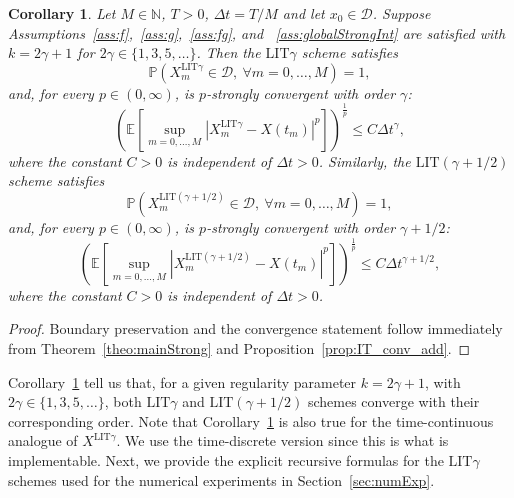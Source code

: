 \documentclass[11pt]{amsart}
\newtheorem{corollary}[theorem]{Corollary}
\newcommand{\N}{{\mathbb N}}
\newcommand{\E}{{\mathbb E}}
\newcommand{\PP}{{\mathbb P}}
\newcommand{\D}{\mathcal{D}}
\newcommand{\LIT}{\textrm{LIT}}
\begin{document}
{\begin{corollary}\label{cor:LIT_conv}
Let $M\in\N$, $T > 0$, $\Delta t = T/M$ and let $x_{0} \in \D$. Suppose Assumptions~\ref{ass:f},~\ref{ass:g},~\ref{ass:fg}, and ~\ref{ass:globalStrongInt} are satisfied with $k = 2 \gamma + 1$ for $2 \gamma \in \{1,3,5,\ldots \}$. Then the $\LIT \gamma$ scheme satisfies
\begin{equation*}
\PP (X^{\LIT \gamma}_{m} \in \D,\ \forall m = 0,\ldots,M) = 1,
\end{equation*}
and, for every $p \in (0,\infty)$, is $p$-strongly convergent with order $\gamma$:
\begin{equation*}
\left( \E \left[ \sup_{m=0, \ldots, M} | X_{m}^{\LIT \gamma} - X(t_{m}) |^{p} \right] \right)^{\frac{1}{p}} \leq C \Delta t^{\gamma},
\end{equation*}
where the constant $C>0$ is independent of $\Delta t >0$. Similarly, the $\LIT (\gamma+1/2)$ scheme satisfies
\begin{equation*}
\PP (X^{\LIT (\gamma+1/2)}_{m} \in \D,\ \forall m = 0,\ldots,M) = 1,
\end{equation*}
and, for every $p \in (0,\infty)$, is $p$-strongly convergent with order $\gamma+1/2$:
\begin{equation*}
\left( \E \left[ \sup_{m=0, \ldots, M} | X_{m}^{\LIT (\gamma+1/2)} - X(t_{m}) |^{p} \right] \right)^{\frac{1}{p}} \leq C \Delta t^{\gamma+1/2},
\end{equation*}
where the constant $C>0$ is independent of $\Delta t >0$.
\end{corollary}
\begin{proof}
Boundary preservation and the convergence statement follow immediately from Theorem~\ref{theo:mainStrong} and Proposition~\ref{prop:IT_conv_add}.
\end{proof}
Corollary~\ref{cor:LIT_conv} tell us that, for a given regularity parameter $k = 2 \gamma + 1$, with $2 \gamma \in \{1,3,5,\ldots \}$, both $\LIT \gamma$ and $\LIT (\gamma+1/2)$ schemes converge with their corresponding order. Note that Corollary~\ref{cor:LIT_conv} is also true for the time-continuous analogue of $X^{\LIT \gamma}$. We use the time-discrete version since this is what is implementable. Next, we provide the explicit recursive formulas for the $\LIT \gamma$ schemes used for the numerical experiments in Section~\ref{sec:numExp}.

}
\end{document}
